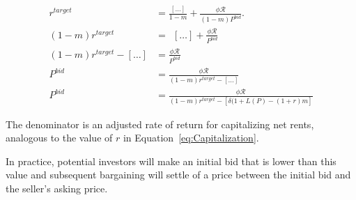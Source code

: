 \begin{align}
r^{target} &= \frac{\left[\dots \right]}{1-m}   +\frac{\phi \mathcal{R}}{(1-m)P^{bid}}. \\
%
(1-m)r^{target} &= \ \  \left[\dots\right] + \frac{\phi \mathcal{R}}{P^{bid}}\\%
%
(1-m)r^{target}-\left[\dots\right]  &=  \frac{\phi \mathcal{R}}{P^{bid}}\\
%
P^{bid} &=    \frac{\phi \mathcal{R}}{(1-m)r^{target}-\left[ \dots\right]}\\
%
P^{bid} &=    \frac{\phi \mathcal{R}}{(1-m)r^{target}-\left[ \delta(1+L(P)- (1+r)m\right]}
\end{align}

The denominator is an adjusted rate of return for capitalizing net rents, analogous to the value of $r$ in Equation~\ref{eq:Capitalization}. 


In practice, potential investors will make an  initial  bid that is lower than this value and subsequent bargaining will settle of a price between the initial bid and the seller's asking price.






